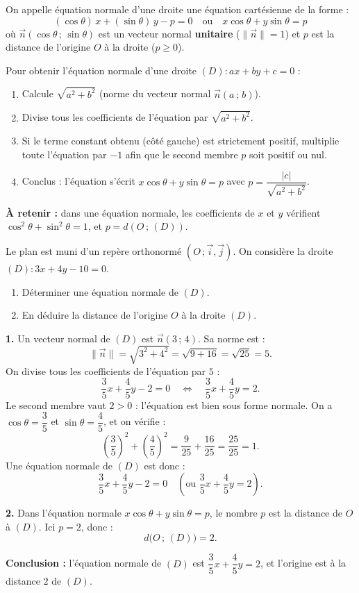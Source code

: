 \documentclass[11pt]{article}
\newcommand{\cle}[1]{{\popxbold\color{popdark}#1}}
\begin{document}
\begin{methode}
On appelle \cle{équation normale} d'une droite une équation cartésienne de la forme :
\[(\cos\theta)\,x+(\sin\theta)\,y-p=0 \quad \text{ou} \quad x\cos\theta+y\sin\theta=p\]
où $\vec{n}(\cos\theta\,;\,\sin\theta)$ est un vecteur normal \textbf{unitaire} ($\|\vec{n}\|=1$) et $p$ est la distance de l'origine $O$ à la droite ($p\geq 0$).

Pour obtenir l'équation normale d'une droite $(D) : ax+by+c=0$ :
\begin{enumerate}
\item Calcule $\sqrt{a^2+b^2}$ (norme du vecteur normal $\vec{n}(a\,;\,b)$).
\item Divise tous les coefficients de l'équation par $\sqrt{a^2+b^2}$.
\item Si le terme constant obtenu (côté gauche) est strictement positif, multiplie toute l'équation par $-1$ afin que le second membre $p$ soit positif ou nul.
\item Conclus : l'équation s'écrit $x\cos\theta+y\sin\theta=p$ avec $p=\dfrac{|c|}{\sqrt{a^2+b^2}}$.
\end{enumerate}
\textbf{À retenir :} dans une équation normale, les coefficients de $x$ et $y$ vérifient $\cos^2\theta+\sin^2\theta=1$, et $p=d(O\,;\,(D))$.
\end{methode}

\begin{exoresolu}
Le plan est muni d'un repère orthonormé $(O\,;\vec{i},\vec{j})$. On considère la droite $(D) : 3x+4y-10=0$.
\begin{enumerate}
\item Déterminer une équation normale de $(D)$.
\item En déduire la distance de l'origine $O$ à la droite $(D)$.
\end{enumerate}
\tcblower
\textbf{1.} Un vecteur normal de $(D)$ est $\vec{n}(3\,;\,4)$. Sa norme est :
\[\|\vec{n}\|=\sqrt{3^2+4^2}=\sqrt{9+16}=\sqrt{25}=5.\]
On divise tous les coefficients de l'équation par $5$ :
\[\frac{3}{5}x+\frac{4}{5}y-2=0 \quad\iff\quad \frac{3}{5}x+\frac{4}{5}y=2.\]
Le second membre vaut $2>0$ : l'équation est bien sous forme normale. On a $\cos\theta=\dfrac{3}{5}$ et $\sin\theta=\dfrac{4}{5}$, et on vérifie :
\[\left(\frac{3}{5}\right)^2+\left(\frac{4}{5}\right)^2=\frac{9}{25}+\frac{16}{25}=\frac{25}{25}=1.\]
Une équation normale de $(D)$ est donc :
\[\frac{3}{5}x+\frac{4}{5}y-2=0 \quad \left(\text{ou } \frac{3}{5}x+\frac{4}{5}y=2\right).\]

\textbf{2.} Dans l'équation normale $x\cos\theta+y\sin\theta=p$, le nombre $p$ est la distance de $O$ à $(D)$. Ici $p=2$, donc :
\[d\big(O\,;\,(D)\big)=2.\]

\textbf{Conclusion :} l'équation normale de $(D)$ est $\dfrac{3}{5}x+\dfrac{4}{5}y=2$, et l'origine est à la distance $2$ de $(D)$.
\end{exoresolu}
\end{document}

